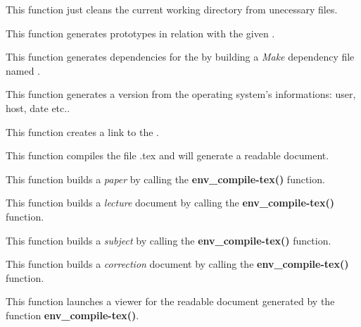          {
	   This function just cleans the current working directory from
	   unecessary files.
	 }

         {
	   This function generates prototypes in relation with the given
	   .
	 }

         {
	   This function generates dependencies for the 
	   by building a \textit{Make} dependency file named .
	 }

         {
	   This function generates a version  from the operating
	   system's informations: user, host, date etc..
	 }

         {
	   This function creates a link  to the .
	 }

         {
	   This function compiles the file .tex and
	   will generate a readable document.
	 }

         {
	   This function builds a \textit{paper} by calling the
	   \textbf{env\_compile-tex()} function.
	 }

         {
	   This function builds a \textit{lecture} document by calling the
	   \textbf{env\_compile-tex()} function.
	 }

         {
	   This function builds a \textit{subject} by calling the
	   \textbf{env\_compile-tex()} function.
	 }

         {
	   This function builds a \textit{correction} document by calling the
	   \textbf{env\_compile-tex()} function.
	 }

         {
	   This function launches a viewer for the readable document
	   generated by the function \textbf{env\_compile-tex()}.
	 }

